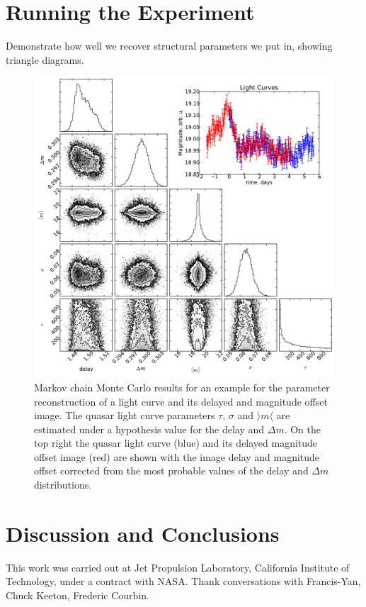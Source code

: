 \documentclass{emulateapj}
\begin{document}
\section{Running the Experiment}\label{}

Demonstrate how well we recover structural parameters we put in, showing triangle diagrams.


\begin{figure}[t]
\begin{center}
\includegraphics[width=\linewidth]{./triangle_example.pdf}
\caption{Markov chain Monte Carlo results for an example for the parameter reconstruction of a light curve and its delayed and magnitude offset image. The quasar light curve parameters $\tau$, $\sigma$ and $\rangle m \langle$ are estimated under a hypothesis value for the delay and $\Delta m$. On the top right the quasar light curve (blue) and its delayed magnitude offset image (red) are shown with the image delay and magnitude offset corrected from the most probable values of the delay and $\Delta m$ distributions.}\label{fig:volume}
\end{center}
\end{figure}

\section{Discussion and Conclusions}\label{sec:disc}

\acknowledgements

This work was carried out at Jet Propulsion Laboratory, California
Institute of Technology, under a contract with NASA.  Thank conversations with Francis-Yan, Chuck Keeton, Frederic Courbin. 




\end{document}
